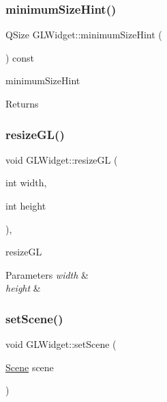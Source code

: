 \subsubsection{\texorpdfstring{minimum\+Size\+Hint()}{minimumSizeHint()}}
{\footnotesize\ttfamily Q\+Size G\+L\+Widget\+::minimum\+Size\+Hint (\begin{DoxyParamCaption}{ }\end{DoxyParamCaption}) const\hspace{0.3cm}{\ttfamily [override]}}



minimum\+Size\+Hint 

\begin{DoxyReturn}{Returns}

\end{DoxyReturn}
\mbox{\label{class_g_l_widget_a71942bbb513fac0a1d4f0c1c24b37def}} 
\subsubsection{\texorpdfstring{resize\+G\+L()}{resizeGL()}}
{\footnotesize\ttfamily void G\+L\+Widget\+::resize\+GL (\begin{DoxyParamCaption}\item[{int}]{width,  }\item[{int}]{height }\end{DoxyParamCaption})\hspace{0.3cm}{\ttfamily [override]}, {\ttfamily [protected]}}



resize\+GL 


\begin{DoxyParams}{Parameters}
{\em width} & \\
\hline
{\em height} & \\
\hline
\end{DoxyParams}
\mbox{\label{class_g_l_widget_ae31adda78d396b83f0891b8cde79a6cf}} 
\subsubsection{\texorpdfstring{set\+Scene()}{setScene()}}
{\footnotesize\ttfamily void G\+L\+Widget\+::set\+Scene (\begin{DoxyParamCaption}\item[{\mbox{\hyperlink{class_scene}{Scene}}}]{scene }\end{DoxyParamCaption})}




